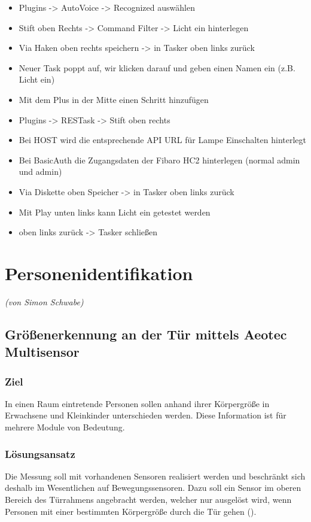 \begin{itemize}
\item Plugins -> AutoVoice -> \glqq Recognized\grqq{} auswählen
\item Stift oben Rechts -> Command Filter -> \glqq Licht ein\grqq{} hinterlegen
\item Via Haken oben rechts speichern -> in Tasker oben links zurück
\item \glqq Neuer Task\grqq{} poppt auf, wir klicken darauf und geben einen Namen ein (z.B. \glqq Licht ein\grqq)
\item Mit dem Plus in der Mitte einen Schritt hinzufügen
\item Plugins -> RESTask -> Stift oben rechts
\item Bei HOST wird die entsprechende API URL für \glqq Lampe Einschalten\grqq{} hinterlegt
\item Bei BasicAuth die Zugangsdaten der Fibaro HC2 hinterlegen (normal \glqq admin\grqq{} und \glqq admin\grqq)
\item Via Diskette oben Speicher -> in Tasker oben links zurück
\item Mit Play unten links kann \glqq Licht ein\grqq{} getestet werden
\item oben links zurück -> Tasker schließen
\end{itemize}

\newpage
\section{Personenidentifikation}

\emph{(von Simon Schwabe)}
\subsection{Größenerkennung an der Tür mittels Aeotec Multisensor}
\label{subsec:groessenerkennungAnTuer}
\subsubsection{Ziel}
In einen Raum eintretende Personen sollen anhand ihrer Körpergröße in Erwachsene und Kleinkinder unterschieden werden. Diese Information ist für mehrere Module von Bedeutung. 

\subsubsection{Lösungsansatz}
Die Messung soll mit vorhandenen Sensoren realisiert werden und beschränkt sich deshalb im Wesentlichen auf Bewegungssensoren. Dazu soll ein Sensor im oberen Bereich des Türrahmens angebracht werden, welcher nur ausgelöst wird, wenn Personen mit einer bestimmten Körpergröße durch die Tür gehen ().

